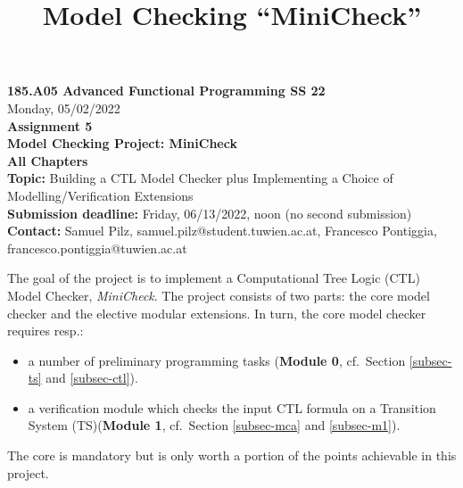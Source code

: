 \documentclass{article}
\title{Model Checking ``MiniCheck''}
\begin{document}
\large
\thispagestyle{empty}
\begin{center}
  {\Large \textbf{185.A05 Advanced Functional Programming SS 22}}  \\ [1ex] 
            Monday, 05/02/2022 \\
               {\Large \textbf{Assignment 5}} \\[.5ex]
              {\Large \textbf{Model Checking Project: MiniCheck}} \\[.5ex]
                 \textbf{All Chapters}  \\ [.75ex]
           \textbf{Topic:} Building a CTL Model Checker plus Implementing a Choice of Modelling/Verification Extensions  \\[1ex]
          \textbf{Submission deadline:} Friday, 06/13/2022, noon (no second submission)  \\ [0.5ex]
          \textbf{Contact:} Samuel Pilz, samuel.pilz@student.tuwien.ac.at, 
                            Francesco Pontiggia, francesco.pontiggia@tuwien.ac.at 
\end{center}

\vspace{1ex}
\noindent
\noindent





\newcommand{\code}[1]{\texttt{#1}}

\noindent
The goal of the project is to implement a Computational Tree Logic (CTL) Model Checker, \textit{MiniCheck}. 
The project consists of two parts: the core model checker and the elective modular extensions. 
In turn, the core model checker requires resp.: 
\begin{itemize}
    \item a number of preliminary programming tasks (\textbf{Module 0}, cf.~Section \ref{subsec-ts} and \ref{subsec-ctl}).
    \item a verification module which checks the input CTL formula on a Transition System (TS)(\textbf{Module 1}, cf.~Section \ref{subsec-mca} and \ref{subsec-m1}).

\end{itemize}  
The core is mandatory but is only worth a portion of the points achievable in this project.
\end{document}
